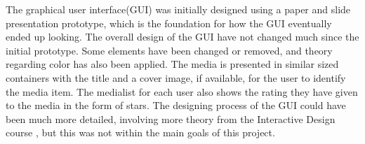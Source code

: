 The graphical user interface(GUI) was initially designed using a paper and slide presentation prototype, which is the foundation for how the GUI eventually ended up looking. The overall design of the GUI have not changed much since the initial prototype. Some elements have been changed or  removed, and theory regarding color has also been applied. The media is presented in similar sized containers with the title and a cover image, if available, for the user to identify the media item. The medialist for each user also shows the rating they have given to the media in the form of stars. The designing process of the GUI could have been much more detailed, involving more theory from the Interactive Design course \cite{DEBBook}, but this was not within the main goals of this project.